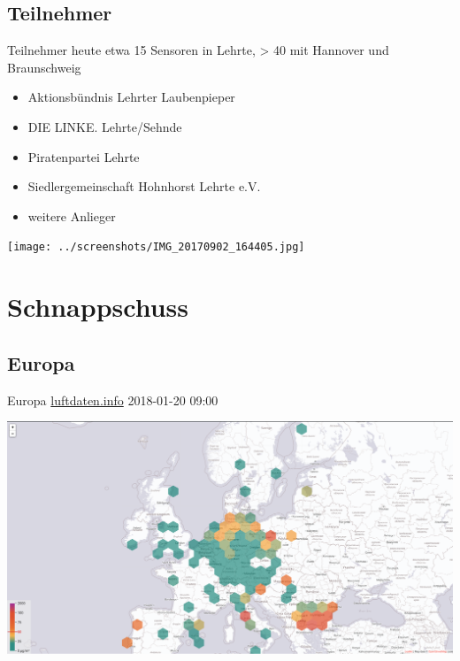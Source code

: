 \documentclass[aspectratio=169]{beamer} %
\begin{document}
\subsection{Teilnehmer}
\begin{frame}{Teilnehmer}
heute etwa 15 Sensoren in Lehrte, > 40 mit Hannover und Braunschweig
  \begin{itemize}
  \item Aktionsbündnis Lehrter Laubenpieper
  \item DIE LINKE. Lehrte/Sehnde
  \item Piratenpartei Lehrte
  \item Siedlergemeinschaft Hohnhorst Lehrte e.V.
  \item weitere Anlieger
  \end{itemize}
  \begin{center}
    \texttt{[image: ../screenshots/IMG\_20170902\_164405.jpg]}
  \end{center}
\end{frame}

\section{Schnappschuss}
\subsection{Europa}
\begin{frame}{Europa \href{http://hannover.maps.luftdaten.info/\#5/52.373/10.005}{luftdaten.info} 2018-01-20 09:00}
  \begin{center}
    \includegraphics[width=\textwidth]{../screenshots/luftdaten-zoom-e.png}
  \end{center}
\end{frame}
\end{document}
